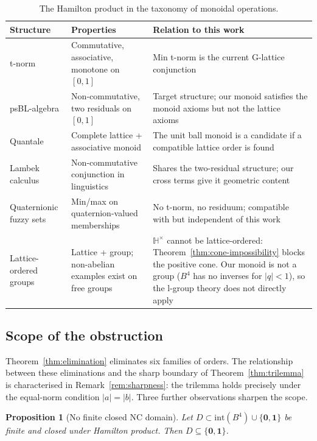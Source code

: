 \documentclass[11pt,a4paper]{article}
\newtheorem{proposition}[theorem]{Proposition}
\newcommand{\Hq}{\mathbb{H}}
\begin{document}
\begin{table}[H]
\centering
\caption{The Hamilton product in the taxonomy of monoidal operations.}
\label{tab:comparison}
\begin{tabularx}{\textwidth}{@{}>{\raggedright\arraybackslash}p{3cm}YY@{}}
\toprule
\textbf{Structure} & \textbf{Properties} & \textbf{Relation to this work} \\
\midrule
t-norm \citep{hajek1998} & Commutative, associative, monotone on
  $[0,1]$ & Min t-norm is the current G-lattice conjunction \\
psBL-algebra \citep{hajek2003} & Non-commutative, two residuals on
  $[0,1]$ & Target structure; our monoid satisfies the monoid axioms
  but not the lattice axioms \\
Quantale \citep{mulvey1986} & Complete lattice + associative monoid &
  The unit ball monoid is a candidate if a compatible lattice order is
  found \\
Lambek calculus \citep{lambek1958} & Non-commutative conjunction
  in linguistics & Shares the two-residual structure; our cross terms
  give it geometric content \\
Quaternionic fuzzy sets \citep{dai2023} & Min/max on
  quaternion-valued memberships & No t-norm, no residuum;
  compatible with but independent of this work \\
Lattice-ordered groups \citep{kopytov1994} & Lattice + group;
  non-abelian examples exist on free groups & $\Hq^\times$ cannot be
  lattice-ordered: Theorem~\ref{thm:cone-impossibility} blocks the
  positive cone. Our monoid is not a group ($B^4$ has no inverses for
  $|q| < 1$), so the l-group theory does not directly apply \\
\bottomrule
\end{tabularx}
\end{table}

\subsection{Scope of the obstruction}
\label{sec:scope}

Theorem~\ref{thm:elimination} eliminates six families of orders.
The relationship between these eliminations and the sharp boundary
of Theorem~\ref{thm:trilemma} is characterised in
Remark~\ref{rem:sharpness}: the trilemma holds precisely under the
equal-norm condition $|a| = |b|$. Three further observations
sharpen the scope.

\begin{proposition}[No finite closed NC domain]
\label{prop:finite-domain}
Let $D \subset \mathrm{int}(B^4) \cup \{\mathbf{0}, \mathbf{1}\}$
be finite and closed under Hamilton product. Then
$D \subseteq \{\mathbf{0}, \mathbf{1}\}$.
\end{proposition}
\end{document}
